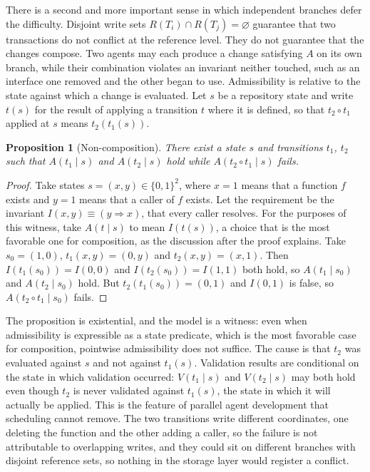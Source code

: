 \documentclass[11pt]{article}
\theoremstyle{definition}
\theoremstyle{plain}
\newtheorem{proposition}{Proposition}
\begin{document}
There is a second and more important sense in which independent branches defer the difficulty. Disjoint write sets $R(T_i)\cap R(T_j)=\varnothing$ guarantee that two transactions do not conflict at the reference level. They do not guarantee that the changes compose. Two agents may each produce a change satisfying $A$ on its own branch, while their combination violates an invariant neither touched, such as an interface one removed and the other began to use. Admissibility is relative to the state against which a change is evaluated. Let $s$ be a repository state and write $t(s)$ for the result of applying a transition $t$ where it is defined, so that $t_2\circ t_1$ applied at $s$ means $t_2(t_1(s))$.

\begin{proposition}[Non-composition]
There exist a state $s$ and transitions $t_1$, $t_2$ such that $A(t_1\mid s)$ and $A(t_2\mid s)$ hold while $A(t_2\circ t_1\mid s)$ fails.
\end{proposition}
\begin{proof}
Take states $s=(x,y)\in\{0,1\}^2$, where $x=1$ means that a function $f$ exists and $y=1$ means that a caller of $f$ exists. Let the requirement be the invariant $I(x,y)\equiv(y\Rightarrow x)$, that every caller resolves. For the purposes of this witness, take $A(t\mid s)$ to mean $I(t(s))$, a choice that is the most favorable one for composition, as the discussion after the proof explains. Take $s_0=(1,0)$, $t_1(x,y)=(0,y)$ and $t_2(x,y)=(x,1)$. Then $I(t_1(s_0))=I(0,0)$ and $I(t_2(s_0))=I(1,1)$ both hold, so $A(t_1\mid s_0)$ and $A(t_2\mid s_0)$ hold. But $t_2(t_1(s_0))=(0,1)$ and $I(0,1)$ is false, so $A(t_2\circ t_1\mid s_0)$ fails.
\end{proof}

The proposition is existential, and the model is a witness: even when admissibility is expressible as a state predicate, which is the most favorable case for composition, pointwise admissibility does not suffice. The cause is that $t_2$ was evaluated against $s$ and not against $t_1(s)$. Validation results are conditional on the state in which validation occurred: $V(t_1\mid s)$ and $V(t_2\mid s)$ may both hold even though $t_2$ is never validated against $t_1(s)$, the state in which it will actually be applied. This is the feature of parallel agent development that scheduling cannot remove. The two transitions write different coordinates, one deleting the function and the other adding a caller, so the failure is not attributable to overlapping writes, and they could sit on different branches with disjoint reference sets, so nothing in the storage layer would register a conflict.
\end{document}
